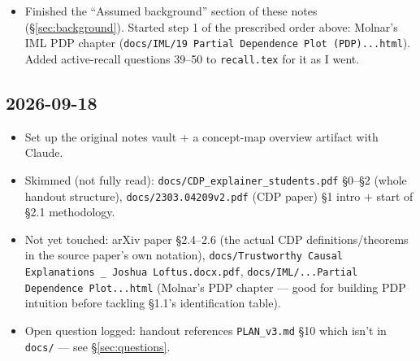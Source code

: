 \begin{itemize}
    paper, arXiv:2303.04209, \textbf{\S1--2 carefully, skim the rest}; (3)
    this project explainer (\texttt{docs/CDP\_explainer\_students.pdf}).
    Two corrections to how I'd been scoping things: ``\S1--2'' means the
    \emph{whole} methodology section (\S2.1 through \S2.6, not just
    \S2.4--2.6 as I'd guessed), and the paper comes \emph{before}
    rereading the handout, not after --- read the source's own definitions
    first, then see how the handout reframes/scopes them for this project,
    rather than the other way around.
  \item Finished the ``Assumed background'' section of these notes
    (\S\ref{sec:background}). Started step 1 of the prescribed order above:
    Molnar's IML PDP chapter (\texttt{docs/IML/19 Partial Dependence Plot
    (PDP)...html}). Added active-recall questions 39--50 to
    \texttt{recall.tex} for it as I went.
\end{itemize}

\subsection*{2026-09-18}
\begin{itemize}
  \item Set up the original notes vault + a concept-map overview artifact
    with Claude.
  \item Skimmed (not fully read): \texttt{docs/CDP\_explainer\_students.pdf}
    \S0--\S2 (whole handout structure), \texttt{docs/2303.04209v2.pdf} (CDP
    paper) \S1 intro $+$ start of \S2.1 methodology.
  \item Not yet touched: arXiv paper \S2.4--2.6 (the actual
    CDP definitions/theorems in the source paper's own notation),
    \texttt{docs/Trustworthy Causal Explanations \_ Joshua Loftus.docx.pdf},
    \texttt{docs/IML/...Partial Dependence Plot...html} (Molnar's PDP
    chapter --- good for building PDP intuition before tackling
    \S1.1's identification table).
  \item Open question logged: handout references \texttt{PLAN\_v3.md} \S10
    which isn't in \texttt{docs/} --- see \S\ref{sec:questions}.
\end{itemize}

